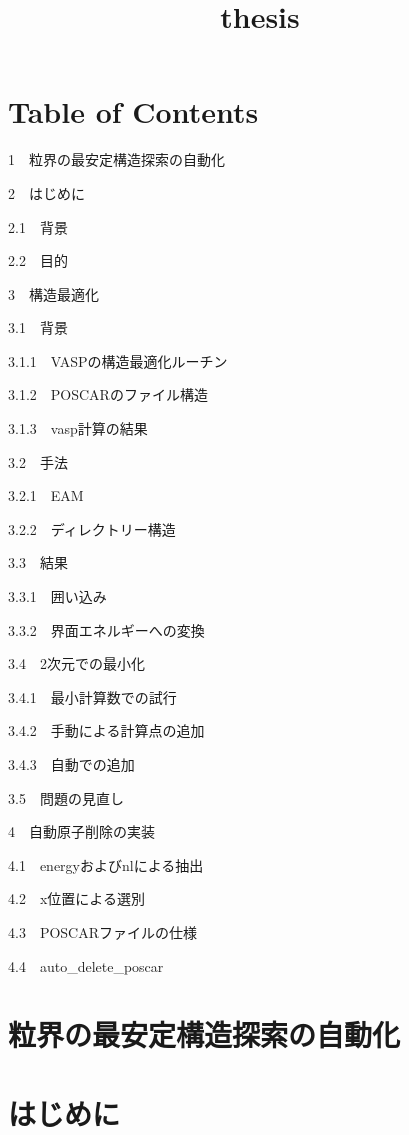 \documentclass[11pt,dvipdfmx]{jsarticle}
\title{thesis}
\begin{document}
    
    
    \maketitle
    
    

    
    \section{Table of Contents}\label{table-of-contents}

{1~~}粒界の最安定構造探索の自動化

{2~~}はじめに

{2.1~~}背景

{2.2~~}目的

{3~~}構造最適化

{3.1~~}背景

{3.1.1~~}VASPの構造最適化ルーチン

{3.1.2~~}POSCARのファイル構造

{3.1.3~~}vasp計算の結果

{3.2~~}手法

{3.2.1~~}EAM

{3.2.2~~}ディレクトリー構造

{3.3~~}結果

{3.3.1~~}囲い込み

{3.3.2~~}界面エネルギーへの変換

{3.4~~}2次元での最小化

{3.4.1~~}最小計算数での試行

{3.4.2~~}手動による計算点の追加

{3.4.3~~}自動での追加

{3.5~~}問題の見直し

{4~~}自動原子削除の実装

{4.1~~}energyおよびnlによる抽出

{4.2~~}x位置による選別

{4.3~~}POSCARファイルの仕様

{4.4~~}auto\_delete\_poscar

    \section{粒界の最安定構造探索の自動化}\label{ux7c92ux754cux306eux6700ux5b89ux5b9aux69cbux9020ux63a2ux7d22ux306eux81eaux52d5ux5316}

    \section{はじめに}\label{ux306fux3058ux3081ux306b}
\end{document}
